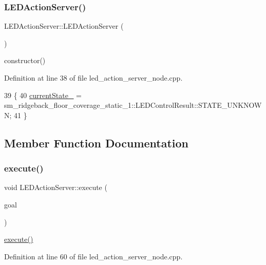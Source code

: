 \subsubsection{\texorpdfstring{L\+E\+D\+Action\+Server()}{LEDActionServer()}\hspace{0.1cm}{\footnotesize\ttfamily [4/4]}}
{\footnotesize\ttfamily L\+E\+D\+Action\+Server\+::\+L\+E\+D\+Action\+Server (\begin{DoxyParamCaption}{ }\end{DoxyParamCaption})\hspace{0.3cm}{\ttfamily [inline]}}

constructor() 

Definition at line 38 of file led\+\_\+action\+\_\+server\+\_\+node.\+cpp.


\begin{DoxyCode}
39   \{
40     \hyperlink{classLEDActionServer_a1dc456e987dc331501ad6ff2215661ff}{currentState\_} =  sm\_ridgeback\_floor\_coverage\_static\_1::LEDControlResult::STATE\_UNKNOWN;
41   \}
\end{DoxyCode}


\subsection{Member Function Documentation}
\mbox{\label{classLEDActionServer_a2d8b9dfca1912e24170ef69a5edf5e9b}} 
\subsubsection{\texorpdfstring{execute()}{execute()}\hspace{0.1cm}{\footnotesize\ttfamily [1/4]}}
{\footnotesize\ttfamily void L\+E\+D\+Action\+Server\+::execute (\begin{DoxyParamCaption}\item[{const sm\+\_\+dance\+\_\+bot\+::\+L\+E\+D\+Control\+Goal\+Const\+Ptr \&}]{goal }\end{DoxyParamCaption})\hspace{0.3cm}{\ttfamily [inline]}}

\hyperlink{classLEDActionServer_a2d8b9dfca1912e24170ef69a5edf5e9b}{execute()} 

Definition at line 60 of file led\+\_\+action\+\_\+server\+\_\+node.\+cpp.



